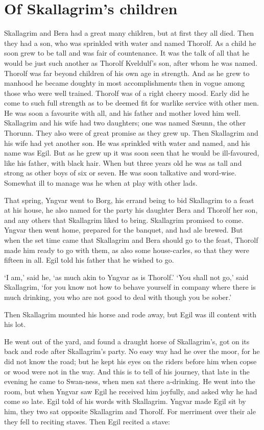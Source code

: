 \chapter{Of Skallagrim's children}
Skallagrim and Bera had a great many children, but at first they all died. Then they had a son, who was sprinkled with water and named Thorolf. As a child he soon grew to be tall and was fair of countenance. It was the talk of all that he would be just such another as Thorolf Kveldulf's son, after whom he was named. Thorolf was far beyond children of his own age in strength. And as he grew to manhood he became doughty in most accomplishments then in vogue among those who were well trained. Thorolf was of a right cheery mood. Early did he come to such full strength as to be deemed fit for warlike service with other men. He was soon a favourite with all, and his father and mother loved him well. Skallagrim and his wife had two daughters; one was named S\ae unn, the other Thorunn. They also were of great promise as they grew up. Then Skallagrim and his wife had yet another son. He was sprinkled with water and named, and his name was Egil. But as he grew up it was soon seen that he would be ill-favoured, like his father, with black hair. When but three years old he was as tall and strong as other boys of six or seven. He was soon talkative and word-wise. Somewhat ill to manage was he when at play with other lads.

That spring, Yngvar went to Borg, his errand being to bid Skallagrim to a feast at his house, he also named for the party his daughter Bera and Thorolf her son, and any others that Skallagrim liked to bring. Skallagrim promised to come. Yngvar then went home, prepared for the banquet, and had ale brewed. But when the set time came that Skallagrim and Bera should go to the feast, Thorolf made him ready to go with them, as also some house-carles, so that they were fifteen in all. Egil told his father that he wished to go.

`I am,' said he, `as much akin to Yngvar as is Thorolf.'
`You shall not go,' said Skallagrim, `for you know not how to behave yourself in company where there is much drinking, you who are not good to deal with though you be sober.'

Then Skallagrim mounted his horse and rode away, but Egil was ill content with his lot.

He went out of the yard, and found a draught horse of Skallagrim's, got on its back and rode after Skallagrim's party. No easy way had he over the moor, for he did not know the road; but he kept his eyes on the riders before him when copse or wood were not in the way. And this is to tell of his journey, that late in the evening he came to Swan-ness, when men sat there a-drinking. He went into the room, but when Yngvar saw Egil he received him joyfully, and asked why he had come so late. Egil told of his words with Skallagrim. Yngvar made Egil sit by him, they two sat opposite Skallagrim and Thorolf. For merriment over their ale they fell to reciting staves. Then Egil recited a stave:

